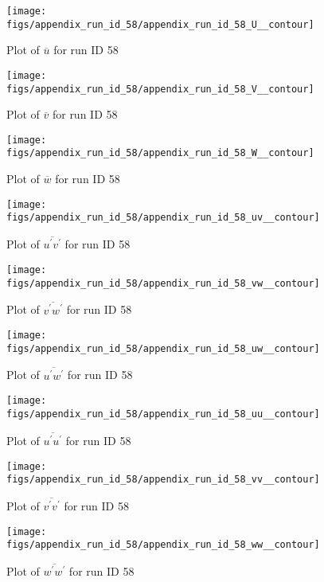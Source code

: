 \begin{figure}[H]
\centering
\texttt{[image: figs/appendix\_run\_id\_58/appendix\_run\_id\_58\_U\_\_contour]}
\caption{Plot of $\overline{u}$ for run ID 58}
\label{fig:appendix_run_id_58_U__contour}
\end{figure}


\begin{figure}[H]
\centering
\texttt{[image: figs/appendix\_run\_id\_58/appendix\_run\_id\_58\_V\_\_contour]}
\caption{Plot of $\overline{v}$ for run ID 58}
\label{fig:appendix_run_id_58_V__contour}
\end{figure}


\begin{figure}[H]
\centering
\texttt{[image: figs/appendix\_run\_id\_58/appendix\_run\_id\_58\_W\_\_contour]}
\caption{Plot of $\overline{w}$ for run ID 58}
\label{fig:appendix_run_id_58_W__contour}
\end{figure}


\begin{figure}[H]
\centering
\texttt{[image: figs/appendix\_run\_id\_58/appendix\_run\_id\_58\_uv\_\_contour]}
\caption{Plot of $\overline{u^\prime v^\prime}$ for run ID 58}
\label{fig:appendix_run_id_58_uv__contour}
\end{figure}


\begin{figure}[H]
\centering
\texttt{[image: figs/appendix\_run\_id\_58/appendix\_run\_id\_58\_vw\_\_contour]}
\caption{Plot of $\overline{v^\prime w^\prime}$ for run ID 58}
\label{fig:appendix_run_id_58_vw__contour}
\end{figure}


\begin{figure}[H]
\centering
\texttt{[image: figs/appendix\_run\_id\_58/appendix\_run\_id\_58\_uw\_\_contour]}
\caption{Plot of $\overline{u^\prime w^\prime}$ for run ID 58}
\label{fig:appendix_run_id_58_uw__contour}
\end{figure}


\begin{figure}[H]
\centering
\texttt{[image: figs/appendix\_run\_id\_58/appendix\_run\_id\_58\_uu\_\_contour]}
\caption{Plot of $\overline{u^\prime u^\prime}$ for run ID 58}
\label{fig:appendix_run_id_58_uu__contour}
\end{figure}


\begin{figure}[H]
\centering
\texttt{[image: figs/appendix\_run\_id\_58/appendix\_run\_id\_58\_vv\_\_contour]}
\caption{Plot of $\overline{v^\prime v^\prime}$ for run ID 58}
\label{fig:appendix_run_id_58_vv__contour}
\end{figure}


\begin{figure}[H]
\centering
\texttt{[image: figs/appendix\_run\_id\_58/appendix\_run\_id\_58\_ww\_\_contour]}
\caption{Plot of $\overline{w^\prime w^\prime}$ for run ID 58}
\label{fig:appendix_run_id_58_ww__contour}
\end{figure}


